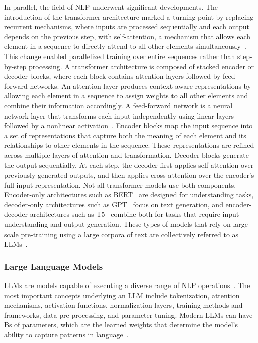 \documentclass[
english,                 %
bibtex,                  %
includeExtraAbstracts, %
]{kththesis}
\numberwithin{listing}{chapter}
\begin{document}
In parallel, the field of \gls{NLP} underwent significant developments. The introduction of the transformer architecture marked a turning point by replacing recurrent mechanisms, where inputs are processed sequentially and each output depends on the previous step, with self-attention, a mechanism that allows each element in a sequence to directly attend to all other elements simultaneously~\cite{vaswani_attention_2017}. This change enabled parallelized training over entire sequences rather than step-by-step processing. A transformer architecture is composed of stacked encoder or decoder blocks, where each block contains attention layers followed by feed-forward networks. An attention layer produces context-aware representations by allowing each element in a sequence to assign weights to all other elements and combine their information accordingly. A feed-forward network is a neural network layer that transforms each input independently using linear layers followed by a nonlinear activation~\cite{huang_da-code_2024}. Encoder blocks map the input sequence into a set of representations that capture both the meaning of each element and its relationships to other elements in the sequence. These representations are refined across multiple layers of attention and transformation. Decoder blocks generate the output sequentially. At each step, the decoder first applies self-attention over previously generated outputs, and then applies cross-attention over the encoder’s full input representation. Not all transformer models use both components. Encoder-only architectures such as \gls{BERT}~\cite{devlin_bert_2019} are designed for understanding tasks, decoder-only architectures such as \gls{GPT}~\cite{radford_improving_2018} focus on text generation, and encoder-decoder architectures such as T5~\cite{raffel_exploring_2023} combine both for tasks that require input understanding and output generation. These types of models that rely on large-scale pre-training using a large corpora of text are collectively referred to as \glspl{LLM}~\cite{bandi_power_2023}.

\subsubsection{Large Language Models}

\Glspl{LLM} are models capable of executing a diverse range of \gls{NLP} operations~\cite{raiaan_review_2024}. The most important concepts underlying an \gls{LLM} include tokenization, attention mechanisms, activation functions, normalization layers, training methods and frameworks, data pre-processing, and parameter tuning. Modern \glspl{LLM} can have \glspl{B} of parameters, which are the learned weights that determine the model’s ability to capture patterns in language~\cite{brown_language_2020}.
\end{document}
